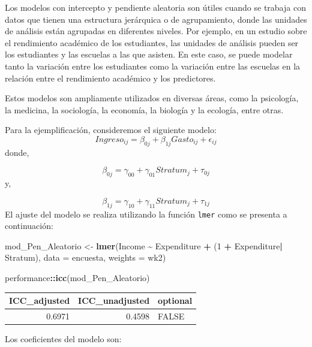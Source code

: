 \documentclass[
  12pt,
]{book}
\newenvironment{Shaded}{\begin{snugshade}}{\end{snugshade}}
\newcommand{\AttributeTok}[1]{\textcolor[rgb]{0.13,0.29,0.53}{#1}}
\newcommand{\DataTypeTok}[1]{\textcolor[rgb]{0.13,0.29,0.53}{#1}}
\newcommand{\DecValTok}[1]{\textcolor[rgb]{0.00,0.00,0.81}{#1}}
\newcommand{\FunctionTok}[1]{\textcolor[rgb]{0.13,0.29,0.53}{\textbf{#1}}}
\newcommand{\NormalTok}[1]{#1}
\newcommand{\OtherTok}[1]{\textcolor[rgb]{0.56,0.35,0.01}{#1}}
\newcommand{\SpecialCharTok}[1]{\textcolor[rgb]{0.81,0.36,0.00}{\textbf{#1}}}
\begin{document}
Los modelos con intercepto y pendiente aleatoria son útiles cuando se trabaja con datos que tienen una estructura jerárquica o de agrupamiento, donde las unidades de análisis están agrupadas en diferentes niveles. Por ejemplo, en un estudio sobre el rendimiento académico de los estudiantes, las unidades de análisis pueden ser los estudiantes y las escuelas a las que asisten. En este caso, se puede modelar tanto la variación entre los estudiantes como la variación entre las escuelas en la relación entre el rendimiento académico y los predictores.

Estos modelos son ampliamente utilizados en diversas áreas, como la psicología, la medicina, la sociología, la economía, la biología y la ecología, entre otras.

Para la ejemplificación, consideremos el siguiente modelo:
\[
Ingreso_{ij}=\beta_{0j}+\beta_{1j}Gasto_{ij}+\epsilon_{ij}
\]
donde,

\[
\beta_{0j} = \gamma_{00}+\gamma_{01}Stratum_{j} + \tau_{0j}
\]
y,

\[
\beta_{1j} = \gamma_{10}+\gamma_{11}Stratum_{j} + \tau_{1j}
\]
El ajuste del modelo se realiza utilizando la función \texttt{lmer} como se presenta a continuación:

\begin{Shaded}
\begin{Highlighting}[]
\NormalTok{mod\_Pen\_Aleatorio }\OtherTok{\textless{}{-}} \FunctionTok{lmer}\NormalTok{(Income }\SpecialCharTok{\textasciitilde{}}\NormalTok{ Expenditure  }\SpecialCharTok{+}\NormalTok{ (}\DecValTok{1} \SpecialCharTok{+}\NormalTok{ Expenditure}\SpecialCharTok{|}\NormalTok{ Stratum),}
  \AttributeTok{data =}\NormalTok{ encuesta, }\AttributeTok{weights  =}\NormalTok{  wk2)}

\NormalTok{performance}\SpecialCharTok{::}\FunctionTok{icc}\NormalTok{(mod\_Pen\_Aleatorio)}
\end{Highlighting}
\end{Shaded}

\begin{tabular}{r|r|l}
\hline
ICC\_adjusted & ICC\_unadjusted & optional\\
\hline
0.6971 & 0.4598 & FALSE\\
\hline
\end{tabular}

Los coeficientes del modelo son:

\begin{Shaded}
\end{Shaded}
\end{document}

